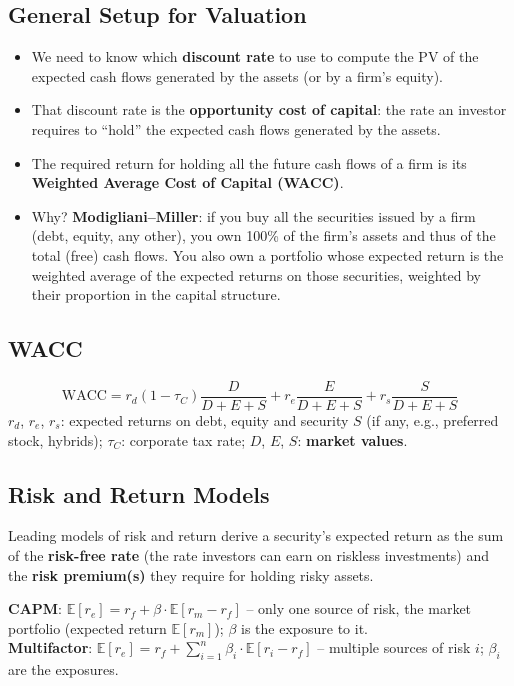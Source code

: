 \subsection{General Setup for Valuation}
\begin{itemize}
  \item We need to know which \textbf{discount rate} to use to compute the PV of the expected cash flows generated by the assets (or by a firm's equity).
  \item That discount rate is the \textbf{opportunity cost of capital}: the rate an investor requires to ``hold'' the expected cash flows generated by the assets.
  \item The required return for holding all the future cash flows of a firm is its \textbf{Weighted Average Cost of Capital (WACC)}.
  \item Why? \textbf{Modigliani--Miller}: if you buy all the securities issued by a firm (debt, equity, any other), you own 100\% of the firm's assets and thus of the total (free) cash flows. You also own a portfolio whose expected return is the weighted average of the expected returns on those securities, weighted by their proportion in the capital structure.
\end{itemize}

\subsection{WACC}
\begin{keybox}
\[
\text{WACC}=r_d(1-\tau_C)\frac{D}{D+E+S}+r_e\frac{E}{D+E+S}+r_s\frac{S}{D+E+S}
\]
$r_d$, $r_e$, $r_s$: expected returns on debt, equity and security $S$ (if any, e.g., preferred stock, hybrids); $\tau_C$: corporate tax rate; $D$, $E$, $S$: \textbf{market values}.
\end{keybox}

\subsection{Risk and Return Models}
Leading models of risk and return derive a security's expected return as the sum of the \textbf{risk-free rate} (the rate investors can earn on riskless investments) and the \textbf{risk premium(s)} they require for holding risky assets.
\begin{keybox}
\textbf{CAPM}: \quad $\mathbb{E}[r_e]=r_f+\beta\cdot\mathbb{E}[r_m-r_f]$ \quad -- only one source of risk, the market portfolio (expected return $\mathbb{E}[r_m]$); $\beta$ is the exposure to it.\\[4pt]
\textbf{Multifactor}: \quad $\mathbb{E}[r_e]=r_f+\sum_{i=1}^{n}\beta_i\cdot\mathbb{E}[r_i-r_f]$ \quad -- multiple sources of risk $i$; $\beta_i$ are the exposures.
\end{keybox}

